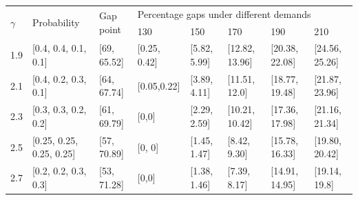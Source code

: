 \begin{table}[]
  \centering
\begin{tabular}{llllllll}
  \hline
  \multicolumn{1}{|l|}{\multirow{2}{*}{$\gamma$}} & \multicolumn{1}{|l|}{\multirow{2}{*}{Probability}} & \multicolumn{1}{l|}{\multirow{2}{*}{Gap point}} & \multicolumn{5}{l|}{Percentage gaps under different demands}   \\ 
  \cline{4-8} 
  \multicolumn{1}{|l|}{} & \multicolumn{1}{l|}{} & \multicolumn{1}{l|}{}  & \multicolumn{1}{l|}{130} & \multicolumn{1}{l|}{150} & \multicolumn{1}{l|}{170} & \multicolumn{1}{l|}{190} & \multicolumn{1}{l|}{210} \\ 
  \hline
  \multicolumn{1}{|l|}{1.9} & \multicolumn{1}{l|}{[0.4, 0.4, 0.1, 0.1]}  & \multicolumn{1}{l|}{[69, 65.52]}  & \multicolumn{1}{l|}{[0.25, 0.42]}  & \multicolumn{1}{l|}{[5.82, 5.99]}  & \multicolumn{1}{l|}{[12.82, 13.96]} & \multicolumn{1}{l|}{[20.38, 22.08]} & \multicolumn{1}{l|}{[24.56, 25.26]} \\
  \hline                                    
  \multicolumn{1}{|l|}{2.1}  & \multicolumn{1}{l|}{[0.4, 0.2, 0.3, 0.1]} & \multicolumn{1}{l|}{[64, 67.74]}  & \multicolumn{1}{l|}{[0.05,0.22]}  & \multicolumn{1}{l|}{[3.89, 4.11]}  & \multicolumn{1}{l|}{[11.51, 12.0]} & \multicolumn{1}{l|}{[18.77, 19.48]} & \multicolumn{1}{l|}{[21.87, 23.96]} \\
  \hline        
  \multicolumn{1}{|l|}{2.3}  & \multicolumn{1}{l|}{[0.3, 0.3, 0.2, 0.2]} & \multicolumn{1}{l|}{[61, 69.79]}  & \multicolumn{1}{l|}{[0,0]}  & \multicolumn{1}{l|}{[2.29, 2.59]}  & \multicolumn{1}{l|}{[10.21, 10.42]} & \multicolumn{1}{l|}{[17.36, 17.98]} & \multicolumn{1}{l|}{[21.16, 21.34]} \\
  \hline      
  \multicolumn{1}{|l|}{2.5}  & \multicolumn{1}{l|}{[0.25, 0.25, 0.25, 0.25]} & \multicolumn{1}{l|}{[57, 70.89]}  & \multicolumn{1}{l|}{[0, 0]}  & \multicolumn{1}{l|}{[1.45, 1.47]}  & \multicolumn{1}{l|}{[8.42, 9.30]} & \multicolumn{1}{l|}{[15.78, 16.33]} & \multicolumn{1}{l|}{[19.80, 20.42]} \\ 
  \hline
  \multicolumn{1}{|l|}{2.7}  & \multicolumn{1}{l|}{[0.2, 0.2, 0.3, 0.3]} & \multicolumn{1}{l|}{[53, 71.28]}  & \multicolumn{1}{l|}{[0,0]}  & \multicolumn{1}{l|}{[1.38, 1.46]}  & \multicolumn{1}{l|}{[7.39, 8.17]} & \multicolumn{1}{l|}{[14.91, 14.95]} & \multicolumn{1}{l|}{[19.14, 19.8]} \\ 
  \hline
\end{tabular}
\end{table}

